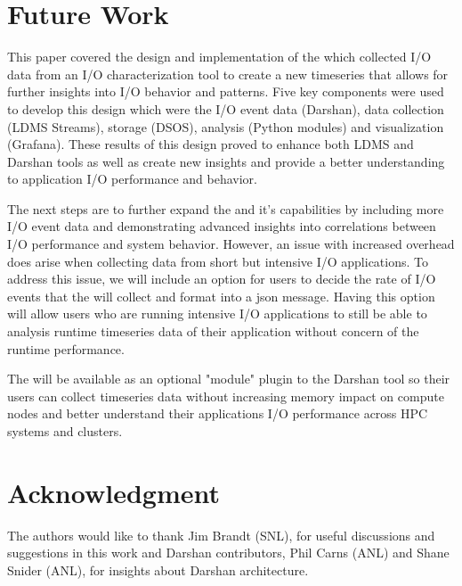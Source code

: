 \section{Future Work}
\label{sec:conclusion}
This paper covered the \Darshan{} design and implementation of the \connector{} which collected I/O data from an I/O characterization tool to create a new timeseries that allows for further insights into I/O behavior and patterns. Five key components were used to develop this design which were the I/O event data (Darshan), data collection (LDMS Streams), storage (DSOS), analysis (Python modules) and visualization (Grafana).
These results of this design proved to enhance both LDMS and Darshan tools as well as create new insights and provide a better understanding to application I/O performance and behavior. 

The next steps are to further expand the \connector{} and it's capabilities by including more I/O event data and demonstrating advanced insights into correlations between I/O performance and system behavior. However, an issue with increased overhead does arise when collecting data from short but intensive I/O applications. 
To address this issue, we will include an option for users to decide the rate of I/O events that the \connector{} will collect and format into a json message. Having this option will allow users who are running intensive I/O applications to still be able to analysis runtime timeseries data of their application without concern of the runtime performance. 

The \Darshan{} will be available as an optional "module" plugin to the Darshan tool so their users can collect timeseries data without increasing memory impact on compute nodes and better understand their applications I/O performance across HPC systems and clusters. 

\section{Acknowledgment}
The authors would like to thank Jim Brandt (SNL), for useful discussions and suggestions in this work and Darshan contributors, Phil Carns (ANL) and Shane Snider (ANL), for insights about Darshan architecture.


